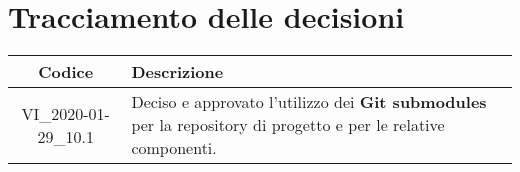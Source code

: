 \section*{Tracciamento delle decisioni}

\begin{center}
	\begin{longtable}{|c|p{12.25cm}|}
	\hline
	\rowcolor{lighter-grayer}
	\textbf{Codice} & \textbf{Descrizione} \\
	\hline
	\endfirsthead
	
	\hline
	VI\_2020-01-29\_10.1 & Deciso e approvato l'utilizzo dei \textbf{Git submodules} per la repository di progetto e per le relative componenti. \\
	\hline

	\end{longtable}
\end{center}